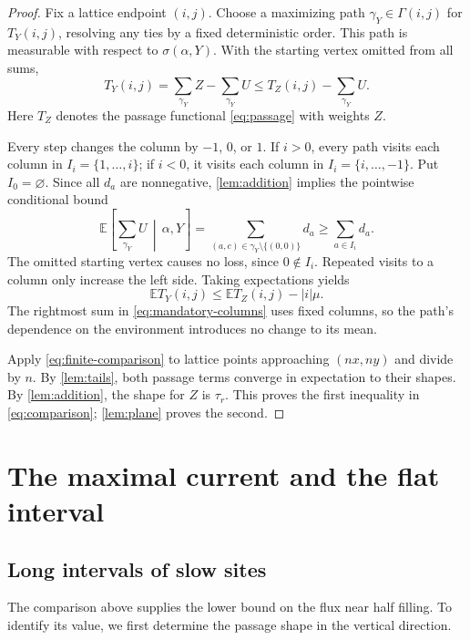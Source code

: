 \documentclass[11pt]{amsart}
\theoremstyle{remark}
\newcommand{\EE}{\mathbb E}
\numberwithin{equation}{section}
\begin{document}
\begin{proof}
Fix a lattice endpoint $(i,j)$. Choose a maximizing path
$\gamma_Y\in\Gamma(i,j)$ for $T_Y(i,j)$, resolving any ties by a
fixed deterministic order. This path is measurable with respect to
$\sigma(\alpha,Y)$. With the starting vertex omitted from all sums,
\begin{equation}\label{eq:path-subtract}
 T_Y(i,j)=\sum_{\gamma_Y}Z-\sum_{\gamma_Y}U
           \leq T_Z(i,j)-\sum_{\gamma_Y}U.
\end{equation}
Here $T_Z$ denotes the passage functional \eqref{eq:passage} with
weights $Z$.

Every step changes the column by $-1$, $0$, or $1$. If $i>0$,
every path visits each column in $I_i=\{1,\ldots,i\}$; if $i<0$,
it visits each column in $I_i=\{i,\ldots,-1\}$. Put $I_0=\varnothing$.
Since all $d_a$ are nonnegative, \cref{lem:addition} implies the
pointwise conditional bound
\begin{equation}\label{eq:mandatory-columns}
 \EE\!\left[\sum_{\gamma_Y}U\,\middle|\,\alpha,Y\right]
     =\sum_{(a,c)\in\gamma_Y\setminus\{(0,0)\}}d_a
     \geq\sum_{a\in I_i}d_a.
\end{equation}
The omitted starting vertex causes no loss, since $0\notin I_i$.
Repeated visits to a column only increase the left side. Taking
expectations yields
\begin{equation}\label{eq:finite-comparison}
 \EE T_Y(i,j)\leq\EE T_Z(i,j)-|i|\mu.
\end{equation}
The rightmost sum in \eqref{eq:mandatory-columns} uses fixed columns,
so the path's dependence on the environment introduces no change to
its mean.

Apply \eqref{eq:finite-comparison} to lattice points approaching
$(nx,ny)$ and divide by $n$. By \cref{lem:tails}, both passage terms
converge in expectation to their shapes. By \cref{lem:addition}, the
shape for $Z$ is $\tau_r$. This proves the first inequality in
\eqref{eq:comparison}; \cref{lem:plane} proves the second.
\end{proof}

\section{The maximal current and the flat interval}\label{sec:proof}

\subsection{Long intervals of slow sites}
The comparison above supplies the lower bound on the flux near half
filling. To identify its value, we first determine the passage shape
in the vertical direction.
\end{document}
